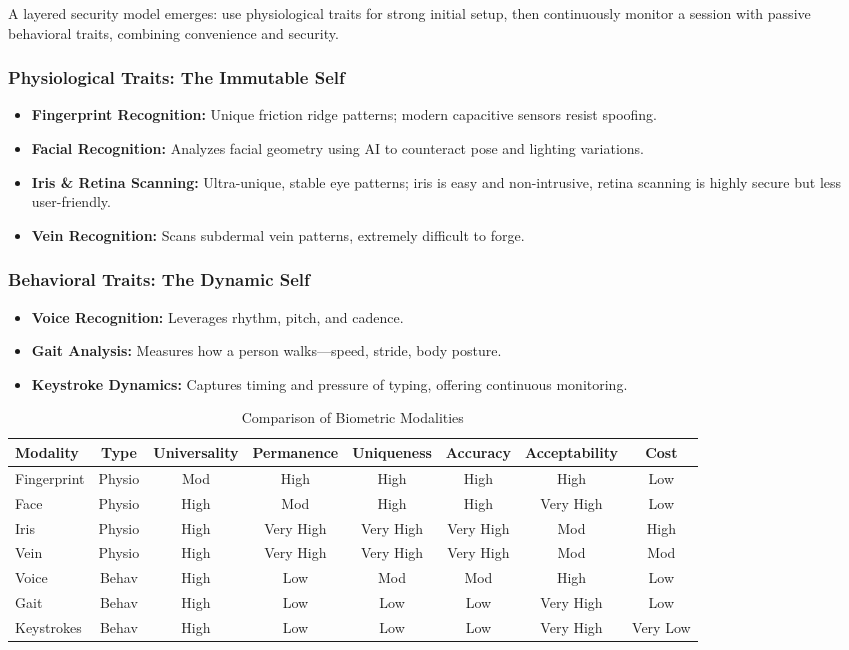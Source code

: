 A layered security model emerges: use physiological traits for strong initial setup, then continuously monitor a session with passive behavioral traits, combining convenience and security.

\subsubsection{Physiological Traits: The Immutable Self}
\begin{itemize}
    \item \textbf{Fingerprint Recognition:} Unique friction ridge patterns; modern capacitive sensors resist spoofing.
    \item \textbf{Facial Recognition:} Analyzes facial geometry using AI to counteract pose and lighting variations.
    \item \textbf{Iris \& Retina Scanning:} Ultra-unique, stable eye patterns; iris is easy and non-intrusive, retina scanning is highly secure but less user-friendly.
    \item \textbf{Vein Recognition:} Scans subdermal vein patterns, extremely difficult to forge.
\end{itemize}

\subsubsection{Behavioral Traits: The Dynamic Self}
\begin{itemize}
    \item \textbf{Voice Recognition:} Leverages rhythm, pitch, and cadence.
    \item \textbf{Gait Analysis:} Measures how a person walks—speed, stride, body posture.
    \item \textbf{Keystroke Dynamics:} Captures timing and pressure of typing, offering continuous monitoring.
\end{itemize}

\begin{table}[h]
\centering
\caption{Comparison of Biometric Modalities}
\begin{tabular}{|l|c|c|c|c|c|c|c|}
\hline
\textbf{Modality} & \textbf{Type} & \textbf{Universality} & \textbf{Permanence} & \textbf{Uniqueness} & \textbf{Accuracy} & \textbf{Acceptability} & \textbf{Cost} \\
\hline
Fingerprint & Physio & Mod & High & High & High & High & Low \\
Face & Physio & High & Mod & High & High & Very High & Low \\
Iris & Physio & High & Very High & Very High & Very High & Mod & High \\
Vein & Physio & High & Very High & Very High & Very High & Mod & Mod \\
Voice & Behav & High & Low & Mod & Mod & High & Low \\
Gait & Behav & High & Low & Low & Low & Very High & Low \\
Keystrokes & Behav & High & Low & Low & Low & Very High & Very Low \\
\hline
\end{tabular}
\end{table}

